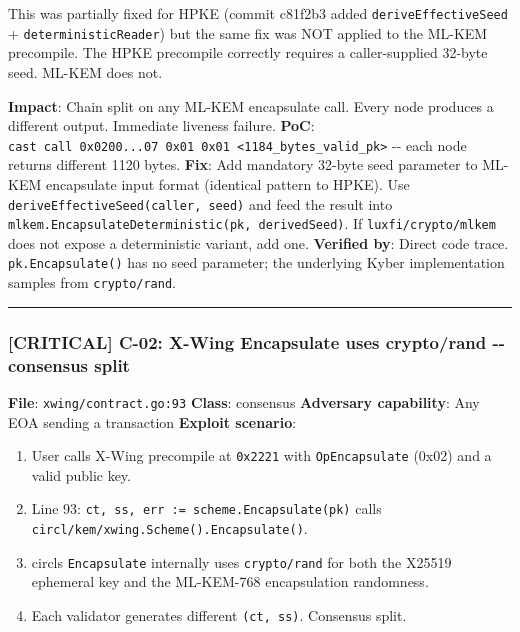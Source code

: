 \documentclass[
]{article}
\providecommand{\tightlist}{%
  \setlength{\itemsep}{0pt}\setlength{\parskip}{0pt}}
\begin{document}
This was partially fixed for HPKE (commit c81f2b3 added
\texttt{deriveEffectiveSeed} + \texttt{deterministicReader}) but the
same fix was NOT applied to the ML-KEM precompile. The HPKE precompile
correctly requires a caller-supplied 32-byte seed. ML-KEM does not.

\textbf{Impact}: Chain split on any ML-KEM encapsulate call. Every node
produces a different output. Immediate liveness failure. \textbf{PoC}:
\texttt{cast\ call\ 0x0200...07\ 0x01\ 0x01\ \textless{}1184\_bytes\_valid\_pk\textgreater{}}
-\/- each node returns different 1120 bytes. \textbf{Fix}: Add mandatory
32-byte seed parameter to ML-KEM encapsulate input format (identical
pattern to HPKE). Use \texttt{deriveEffectiveSeed(caller,\ seed)} and
feed the result into
\texttt{mlkem.EncapsulateDeterministic(pk,\ derivedSeed)}. If
\texttt{luxfi/crypto/mlkem} does not expose a deterministic variant, add
one. \textbf{Verified by}: Direct code trace. \texttt{pk.Encapsulate()}
has no seed parameter; the underlying Kyber implementation samples from
\texttt{crypto/rand}.

\begin{center}\rule{0.5\linewidth}{0.5pt}\end{center}

\subsubsection{{[}CRITICAL{]} C-02: X-Wing Encapsulate uses crypto/rand
-\/- consensus
split}\label{critical-c-02-x-wing-encapsulate-uses-cryptorand----consensus-split}

\textbf{File}: \texttt{xwing/contract.go:93} \textbf{Class}: consensus
\textbf{Adversary capability}: Any EOA sending a transaction
\textbf{Exploit scenario}:

\begin{enumerate}
\def\labelenumi{\arabic{enumi}.}
\tightlist
\item
  User calls X-Wing precompile at \texttt{0x2221} with
  \texttt{OpEncapsulate} (0x02) and a valid public key.
\item
  Line 93: \texttt{ct,\ ss,\ err\ :=\ scheme.Encapsulate(pk)} calls
  \texttt{circl/kem/xwing.Scheme().Encapsulate()}.
\item
  circl\textquotesingle s \texttt{Encapsulate} internally uses
  \texttt{crypto/rand} for both the X25519 ephemeral key and the
  ML-KEM-768 encapsulation randomness.
\item
  Each validator generates different \texttt{(ct,\ ss)}. Consensus
  split.
\end{enumerate}
\end{document}
